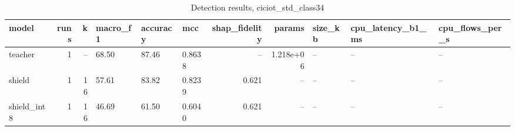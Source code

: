 \begin{table}
\caption{Detection results, ciciot_std_class34}
\begin{tabular}{lrrlllrrlll}
\toprule
model & runs & k & macro_f1 & accuracy & mcc & shap_fidelity & params & size_kb & cpu_latency_b1_ms & cpu_flows_per_s \\
\midrule
teacher & 1 & -- & 68.50 & 87.46 & 0.8638 & -- & 1.218e+06 & -- & -- & -- \\
shield & 1 & 16 & 57.61 & 83.82 & 0.8239 & 0.621 & -- & -- & -- & -- \\
shield_int8 & 1 & 16 & 46.69 & 61.50 & 0.6040 & 0.621 & -- & -- & -- & -- \\
\bottomrule
\end{tabular}
\end{table}
